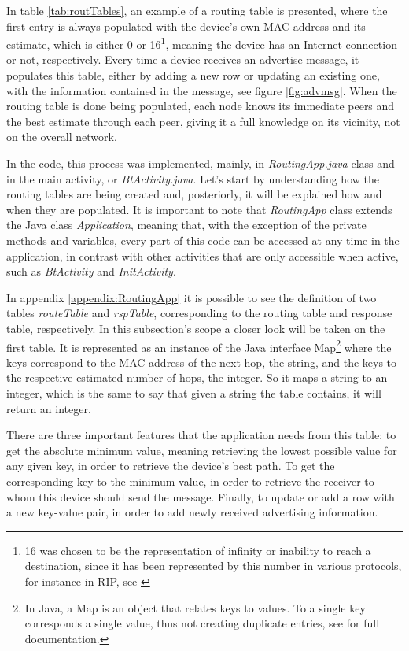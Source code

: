 In table \ref{tab:routTables}, an example of a routing table is presented, where the first entry is always populated with the device's own \gls{MAC} address and its estimate, which is either 0 or 16\footnote{16 was chosen to be the representation of infinity or inability to reach a destination, since it has been represented by this number in various protocols, for instance in \gls{RIP}, see \cite{ripprotocol}}, meaning the device has an Internet connection or not, respectively. Every time a device receives an advertise message, it populates this table, either by adding a new row or updating an existing one, with the information contained in the message, see figure \ref{fig:advmsg}. When the routing table is done being populated, each node knows its immediate peers and the best estimate through each peer, giving it a full knowledge on its vicinity, not on the overall network.

In the code, this process was implemented, mainly, in \textit{RoutingApp.java} class and in the main activity, or \textit{BtActivity.java}. Let's start by understanding how the routing tables are being created and, posteriorly, it will be explained how and when they are populated. It is important to note that \textit{RoutingApp} class extends the Java class \textit{Application}, meaning that, with the exception of the private methods and variables, every part of this code can be accessed at any time in the application, in contrast with other activities that are only accessible when active, such as \textit{BtActivity} and \textit{InitActivity}.

In appendix \ref{appendix:RoutingApp} it is possible to see the definition of two tables \textit{routeTable} and \textit{rspTable}, corresponding to the routing table and response table, respectively. In this subsection's scope a closer look will be taken on the first table. It is represented as an instance of the Java interface Map\footnote{In Java, a Map is an object that relates keys to values. To a single key corresponds a single value, thus not creating duplicate entries, see \cite{map} for full documentation.} where the keys correspond to the \gls{MAC} address of the next hop, the string, and the keys to the respective estimated number of hops, the integer. So it maps a string to an integer, which is the same to say that given a string the table contains, it will return an integer.

There are three important features that the application needs from this table: to get the absolute minimum value, meaning retrieving the lowest possible value for any given key, in order to retrieve the device's best path. To get the corresponding key to the minimum value, in order to retrieve the receiver to whom this device should send the message. Finally, to update or add a row with a new key-value pair, in order to add newly received advertising information.

